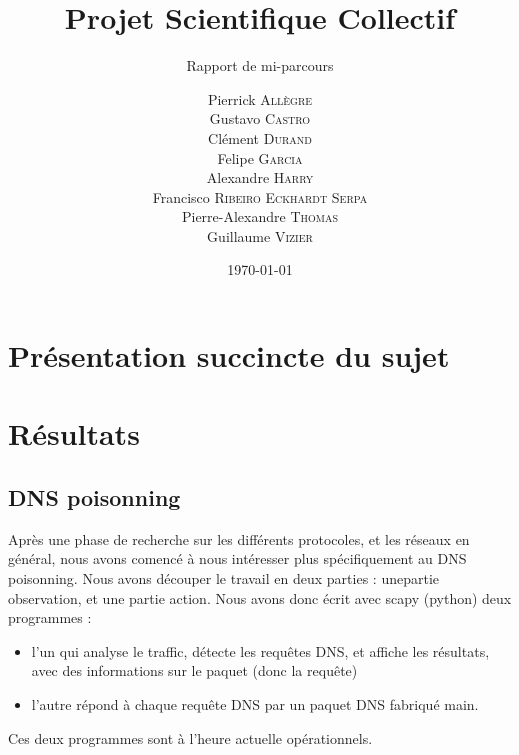 \documentclass[a4paper, 12pt,twoside]{article}
\title{Projet Scientifique Collectif}
\author{Pierrick \textsc{Allègre} \\
		Gustavo \textsc{Castro} \\
		Clément \textsc{Durand} \\
		Felipe \textsc{Garcia} \\
		Alexandre \textsc{Harry} \\
		Francisco \textsc{Ribeiro Eckhardt Serpa} \\
		Pierre-Alexandre \textsc{Thomas} \\
		Guillaume \textsc{Vizier} \\}
\subtitle{Rapport de mi-parcours}
\date{\today}
\begin{document}
\maketitle
\renewcommand{\baselinestretch}{1.1}
\setlength{\parskip}{0.5em}
\tableofcontents
\clearpage

\section*{Présentation succincte du sujet}
	
\section{Résultats}
	\subsection{DNS poisonning}
	
	Après une phase de recherche sur les différents protocoles, et les réseaux en général, nous avons comencé à nous intéresser plus spécifiquement au DNS poisonning. Nous avons découper le travail en deux parties : unepartie observation, et une partie action. Nous avons donc écrit avec scapy (python) deux programmes : \begin{itemize}
	\item l'un qui analyse le traffic, détecte les requêtes DNS, et affiche les résultats, avec des informations sur le paquet (donc la requête)
	\item l'autre répond à chaque requête DNS par un paquet DNS fabriqué main.
\end{itemize}

	Ces deux programmes sont à l'heure actuelle opérationnels. 
	
\end{document}
